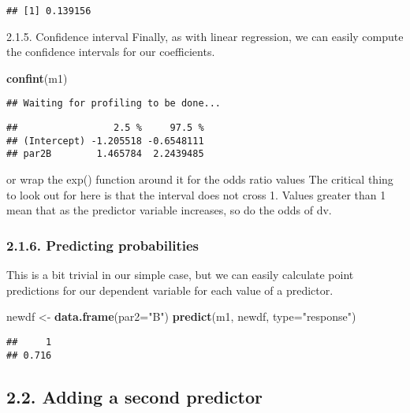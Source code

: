 \documentclass[
]{article}
\newenvironment{Shaded}{\begin{snugshade}}{\end{snugshade}}
\newcommand{\DataTypeTok}[1]{\textcolor[rgb]{0.13,0.29,0.53}{#1}}
\newcommand{\KeywordTok}[1]{\textcolor[rgb]{0.13,0.29,0.53}{\textbf{#1}}}
\newcommand{\NormalTok}[1]{#1}
\newcommand{\StringTok}[1]{\textcolor[rgb]{0.31,0.60,0.02}{#1}}
\begin{document}
\begin{verbatim}
## [1] 0.139156
\end{verbatim}

2.1.5. Confidence interval Finally, as with linear regression, we can
easily compute the confidence intervals for our coefficients.

\begin{Shaded}
\begin{Highlighting}[]
\KeywordTok{confint}\NormalTok{(m1) }
\end{Highlighting}
\end{Shaded}

\begin{verbatim}
## Waiting for profiling to be done...
\end{verbatim}

\begin{verbatim}
##                 2.5 %     97.5 %
## (Intercept) -1.205518 -0.6548111
## par2B        1.465784  2.2439485
\end{verbatim}

or wrap the exp() function around it for the odds ratio values The
critical thing to look out for here is that the interval does not cross
1. Values greater than 1 mean that as the predictor variable increases,
so do the odds of dv.

\hypertarget{predicting-probabilities}{%
\subsubsection{2.1.6. Predicting
probabilities}\label{predicting-probabilities}}

This is a bit trivial in our simple case, but we can easily calculate
point predictions for our dependent variable for each value of a
predictor.

\begin{Shaded}
\begin{Highlighting}[]
\NormalTok{newdf <-}\StringTok{ }\KeywordTok{data.frame}\NormalTok{(}\DataTypeTok{par2=}\StringTok{"B"}\NormalTok{)}
\KeywordTok{predict}\NormalTok{(m1, newdf, }\DataTypeTok{type=}\StringTok{"response"}\NormalTok{)}
\end{Highlighting}
\end{Shaded}

\begin{verbatim}
##     1 
## 0.716
\end{verbatim}

\hypertarget{adding-a-second-predictor}{%
\subsection{2.2. Adding a second
predictor}\label{adding-a-second-predictor}}
\end{document}

